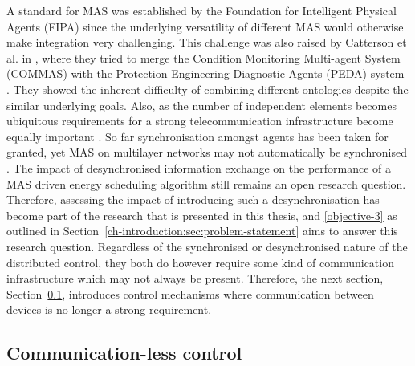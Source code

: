 A standard for MAS was established by the Foundation for Intelligent Physical Agents (FIPA) since the underlying versatility of different MAS would otherwise make integration very challenging.
This challenge was also raised by Catterson et al. in \cite{Catterson2005}, where they tried to merge the Condition Monitoring Multi-agent System (COMMAS) \cite{McArthur2004a} with the Protection Engineering Diagnostic Agents (PEDA) system \cite{Hossack2003a}.
They showed the inherent difficulty of combining different ontologies despite the similar underlying goals.
Also, as the number of independent elements becomes ubiquitous requirements for a strong telecommunication infrastructure become equally important \cite{Hatziargyriou2015}.
So far synchronisation amongst agents has been taken for granted, yet MAS on multilayer networks may not automatically be synchronised \cite{He2017}.
The impact of desynchronised information exchange on the performance of a MAS driven energy scheduling algorithm still remains an open research question.
Therefore, assessing the impact of introducing such a desynchronisation has become part of the research that is presented in this thesis, and \ref{objective-3} as outlined in Section~\ref{ch-introduction:sec:problem-statement} aims to answer this research question.
Regardless of the synchronised or desynchronised nature of the distributed control, they both do however require some kind of communication infrastructure which may not always be present.
Therefore, the next section, Section~\ref{ch-literature:subsec:communication-less-control}, introduces control mechanisms where communication between devices is no longer a strong requirement.

\subsection{Communication-less control}
\label{ch-literature:subsec:communication-less-control}

